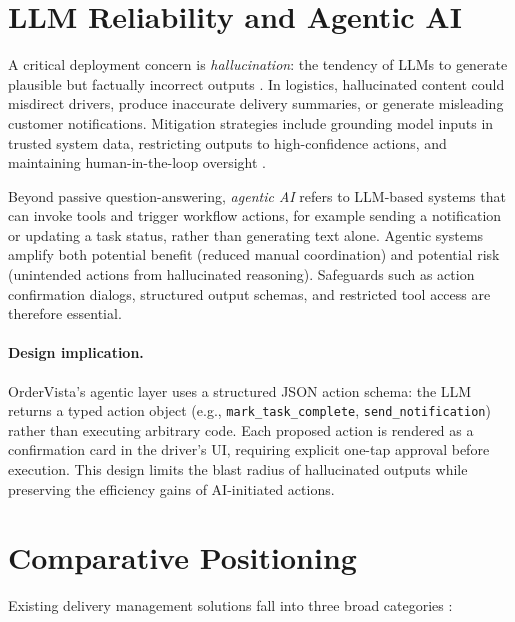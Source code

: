 \section{LLM Reliability and Agentic AI}
\label{sec:lit-agentic}

A critical deployment concern is \emph{hallucination}: the tendency of LLMs to generate plausible but factually incorrect outputs \autocite{ji2024hallucination}. In logistics, hallucinated content could misdirect drivers, produce inaccurate delivery summaries, or generate misleading customer notifications. Mitigation strategies include grounding model inputs in trusted system data, restricting outputs to high-confidence actions, and maintaining human-in-the-loop oversight \autocite{ji2024hallucination,brynjolfsson2023generative}.

Beyond passive question-answering, \emph{agentic AI} refers to LLM-based systems that can invoke tools and trigger workflow actions, for example sending a notification or updating a task status, rather than generating text alone. Agentic systems amplify both potential benefit (reduced manual coordination) and potential risk (unintended actions from hallucinated reasoning). Safeguards such as action confirmation dialogs, structured output schemas, and restricted tool access are therefore essential.

\paragraph{Design implication.}
OrderVista's agentic layer uses a structured JSON action schema: the LLM returns a typed action object (e.g., \texttt{mark\_task\_complete}, \texttt{send\_notification}) rather than executing arbitrary code. Each proposed action is rendered as a confirmation card in the driver's UI, requiring explicit one-tap approval before execution. This design limits the blast radius of hallucinated outputs while preserving the efficiency gains of AI-initiated actions.

\section{Comparative Positioning}
\label{sec:lit-comparison}

Existing delivery management solutions fall into three broad categories \autocite{cachon2017surge,einav2016peer}:

